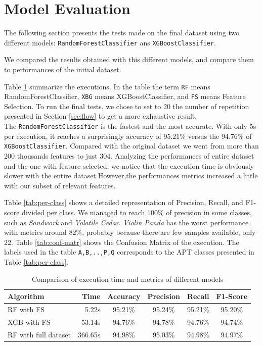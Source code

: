 \section{Model Evaluation}

The following section presents the tests made on the final dataset using two different models: \texttt{RandomForestClassifier} ans \texttt{XGBoostClassifier}.

We compared the results obtained with this different models, and compare them to performances of the initial dataset.

Table \ref{tab:final} summarize the executions. In the table the term \texttt{RF} means RandomForestClassifier, \texttt{XBG} means XGBoostClassifier, and \texttt{FS} means Feature Selection. To run the final tests, we chose to set  to 20 the number of repetition presented in Section \ref{sec:flow} to get a more exhaustive result.\\
The \texttt{RandomForestClassifier} is the fastest and the most accurate. With only 5s per execution, it reaches a surprisingly accuracy of 95.21\% versus the 94.76\% of \texttt{XGBoostClassifier}. Compared with the original dataset we went from more than 200 thousands features to just 304. Analyzing the performances of entire dataset and the one with feature selected, we notice that the execution time is obviously slower with the entire dataset.However,the performances metrics increased a little with our subset of relevant features.

Table \ref{tab:per-class} shows a detailed representation of Precision, Recall, and F1-score divided per class. We managed to reach 100\% of precision in some classes, such as \textit{Sandwork} and \textit{Volatile Cedar}. \textit{Violin Panda} has the worst performance with metrics around 82\%, probably because there are few samples available, only 22. Table
\ref{tab:conf-matr} shows the Confusion Matrix of the execution. The labels used in the table \texttt{A,B,..,P,Q} corresponds to the APT classes presented in Table \ref{tab:per-class}. 
\begin{table}[!h]
	\centering
	\caption{Comparison of execution time and metrics of different models}
	\label{tab:final}
	\begin{tabular}{lrcccc}
		\toprule
		\textbf{Algorithm}                          & \textbf{Time}    & \textbf{Accuracy} & \textbf{Precision} & \textbf{Recall}  & \textbf{F1-Score} \\
		\midrule
		RF with FS & 5.22s   & 95.21\%  & 95.24\%   & 95.21\% & 95.20\%  \\
		XGB with FS      & 53.14s & 94.76\%  & 94.78\%   & 94.76\% & 94.74\%  \\
		RF with full dataset   &  366.65s  & 94.98\% &       95.03\%    &   94.98\%      & 94.97\%\\
		\bottomrule         
	\end{tabular}
\end{table}


